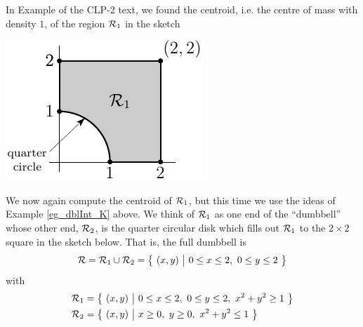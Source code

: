 \begin{eg}
                                                \label{eg_dblInt_L}
In Example  of the CLP-2 text, we found the 
centroid, i.e. the centre of mass with density $1$, of the region $\mathcal{R}_1$ in the
sketch
\begin{efig}
\begin{center}
    \includegraphics{PSIVca}
\end{center}
\end{efig}
We now again compute the centroid of $\mathcal{R}_1$, but this time we use the ideas of 
Example \ref{eg_dblInt_K} above. We think of $\mathcal{R}_1$ as one end of the 
``dumbbell'' whose other end, $\mathcal{R}_2$, is the quarter circular disk which 
fills out $\mathcal{R}_1$ to the $2\times 2$ square in the sketch below.  That is, 
the full 
dumbbell is 
\begin{equation*}
\mathcal{R}=\mathcal{R}_1\cup\mathcal{R}_2=\big\{ \ (x,y)\ \big|\ 0\le x\le 2,\ 0\le y\le 2\ \big\}
\end{equation*}
with
\begin{align*}
\mathcal{R}_1&=\big\{ \ (x,y)\ \big|\ 0\le x\le 2,\ 0\le y\le 2,\ x^2+y^2\ge 1\ \big\} \\
\mathcal{R}_2&=\big\{ \ (x,y)\ \big|\ x\ge 0,\ y\ge 0,\ x^2+y^2\le 1\ \big\} 
\end{align*}
\end{eg}
